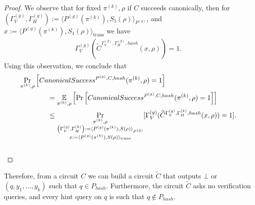 \begin{proof}
We observe that for fixed $\pi^{(k)}, \rho$ if $C$ succeeds canonically, then for $(\Gamma_V^{(g)}, \Gamma_H^{(g)}) := \langle P^{(g)}(\pi^{(k)}), S_1(\rho) \rangle_{P^{(g)}}$, and
$x := \langle P^{(g)}(\pi^{(k)}), S_1(\rho) \rangle_{\text{trans}}$ we have
\begin{align*}
\Gamma_V^{(g)} (\widetilde{C}^{\Gamma_V^{(g)}, \Gamma_H^{(g)}, hash}(x, \rho)) = 1.
\end{align*}
Using this observation, we conclude that
\begin{align*}
  &\underset{\pi^{(k)}, \rho}{\Pr}\left[CanonicalSuccess^{P^{(g)}, C, hash}(\pi^{(k)}, \rho) = 1\right] \\
  &\mbox\qquad\qquad = \underset{\pi^{(k)}, \rho}{\mathbb{E}}\left[\underset{}{\Pr}\left[CanonicalSuccess^{P^{(g)}, C, hash}(\pi^{(k)}, \rho) = 1\right]\right] \\
  &\mbox\qquad\qquad \leq \underset{\substack{\pi^{(k)}, \rho \\
      \left(\Gamma_V^{(g)}, \Gamma_H^{(k)}\right) := \langle P^{(g)}(\pi^{(k)}), S(\rho) \rangle_{P^{(g)}} \\
      x := \langle P^{(g)}(\pi^{(k)}), S(\rho) \rangle_{\text{trans}}}}
  {\Pr}[\Gamma_V^{(g)} (\widetilde{C}^{\Gamma_V^{(g)}, \Gamma_H^{(k)}, hash}(x, \rho)) = 1].
\end{align*}
\\\text{  }
\end{proof}
%
Therefore, from a circuit $C$ we can build a circuit $\widetilde{C}$ that outputs $\bot$ or $(q, y_1, \dots, y_k)$ such that $q \in P_{hash}$.
Furthermore, the circuit $\widetilde{C}$ asks no verification queries, and every hint query on $q$ is such that $q \notin P_{hash}$.
%
